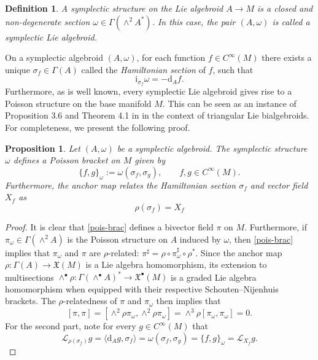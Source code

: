 \documentclass[12pt,letterpaper]{article}
\newtheorem{definition}[theorem]{Definition}
\newtheorem{remark}[theorem]{Remark}
\newtheorem{proposition}[theorem]{Proposition}
\numberwithin{equation}{section}
\begin{document}
\begin{definition}
A \emph{symplectic structure} on the Lie algebroid $A \rightarrow M$ is a 
closed and non-degenerate section $\omega \in \Gamma(\wedge^2 A^* )$.  
In this case, the pair $(A, \omega)$ is called a \emph{symplectic Lie algebroid}.
\end{definition}


On a symplectic algebroid $(A, \omega)$, for each function $f\in C^\infty(M)$ there exists a unique $\sigma_f \in \Gamma( A ) $
called the \emph{Hamiltonian section} of $f$, such that
\begin{equation}
\mathrm{i}_{\sigma_f} \omega = -\mathrm{d}_A f.
\end{equation}
Furthermore, as is well known, 
every symplectic Lie algebroid gives rise to a Poisson structure on the base manifold $M$.
This can be seen as an instance of Proposition 3.6 and Theorem 4.1 in \cite{MackenzieXu1994} 
in the context of triangular Lie bialgebroids.
For completeness, we present the following proof.

\begin{proposition}\label{poisson-base}
Let $(A, \omega)$ be a symplectic algebroid. The symplectic structure $\omega$ defines a Poisson bracket on $M$ given by
\begin{equation}
\{f, g  \}_\omega := \omega(\sigma_f,\sigma_g), \qquad f,g\in C^\infty(M). \label{pois-brac}
\end{equation}
Furthermore, the anchor map relates the Hamiltonian section $\sigma_f$ and vector field $X_f$ as
\begin{equation*}
 \rho(\sigma_f)= X_f
\end{equation*}
\end{proposition}

\begin{proof}
  It is clear that \eqref{pois-brac} defines a bivector field $\pi$ on $M$.
  Furthermore, if $\pi_\omega\in\Gamma(\wedge^2A)$ is the Poisson structure on $A$ induced by $\omega$,
  then \eqref{pois-brac} implies that $\pi_\omega$ and $\pi$ are $\rho$-related: $\pi^\sharp = \rho\circ\pi_\omega^\sharp\circ\rho^{*}$.
  Since the anchor map $\rho:\Gamma(A)\to \mathfrak{X}(M)$ is a Lie algebra homomorphism, 
  its extension to multisections $\wedge^{\bullet}\rho:\Gamma(\wedge^{\bullet}A)^*\to\mathfrak{X}^\bullet(M)$ 
  is a graded Lie algebra homomorphism when equipped with their respective Schouten--Nijenhuis brackets.
  The $\rho$-relatedness of $\pi$ and $\pi_\omega$ then implies that 
  \[
    [\pi,\pi] = [\wedge^2\rho\pi_\omega,\wedge^2\rho\pi_\omega]= \wedge^3\rho[\pi_\omega,\pi_\omega]=0.
  \]
  For the second part, note for every $g\in C^\infty(M)$ that
  \[
    \mathcal{L}_{\rho(\sigma_{f})}g = \langle \mathrm{d}_A g ,  \sigma_{f} \rangle = \omega ( \sigma_{f},\sigma_{g} ) = \{f, g  \}_\omega = \mathcal{L}_{X_f}g. 
  \]
\end{proof}
\end{document}
